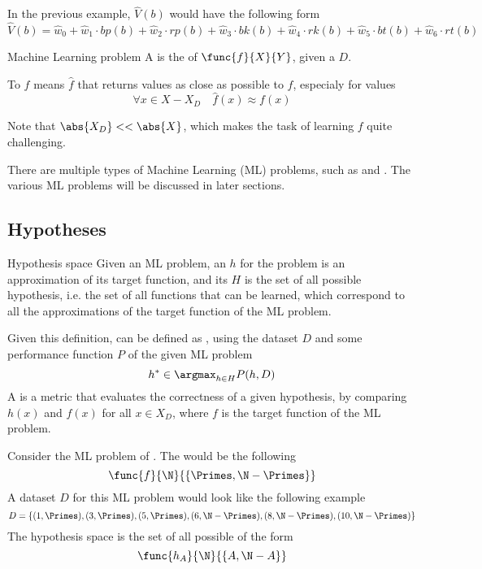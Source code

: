 \documentclass[a4paper, 12pt]{report}
\begin{document}
    In the previous example, $\hat V(b)$ would have the following form $$\hat V(b) = \hat w_0 + \hat w_1 \cdot bp(b) + \hat w_2 \cdot rp(b) + \hat w_3 \cdot bk(b) + \hat w_4 \cdot rk(b) + \hat w_5 \cdot bt(b) + \hat w_6 \cdot rt(b)$$

    \begin{frameddefn}{Machine Learning problem}
        A  is the  of  $\func{f}{X}{Y}$, given a  $D$.

        To  $f$ means  $\hat f$ that returns values as close as possible to $f$, especialy for values  $$\forall x \in  X - X_D \quad \hat f(x) \approx f(x)$$
    \end{frameddefn}

    Note that $\abs{X_D} << \abs{X}$, which makes the task of learning $f$ quite challenging.

    There are multiple types of Machine Learning (ML) problems, such as  and . The various ML problems will be discussed in later sections.

    \subsection{Hypotheses}
    
    \begin{frameddefn}{Hypothesis space}
        Given an ML problem, an  $h$ for the problem is an approximation of its target function, and its  $H$ is the set of all possible hypothesis, i.e. the set of all functions that can be learned, which correspond to all the approximations of the target function of the ML problem.
    \end{frameddefn}

    Given this definition,  can be defined as , using the dataset $D$ and some performance function $P$ of the given ML problem $$h^* \in \argmax_{h \in H}{P(h, D)}$$ A  is a metric that evaluates the correctness of a given hypothesis, by comparing $h(x)$ and $f(x)$ for all $x \in X_D$, where $f$ is the target function of the ML problem.

    \begin{example}[Hypothesis]
        Consider the ML problem of . The  would be the following $$\func{f}{\N}{\{\Primes, \N - \Primes\}}$$ A dataset $D$ for this ML problem would look like the following example $$D = \{(1, \Primes), (3, \Primes), (5, \Primes), (6, \N - \Primes), (8, \N - \Primes), (10, \N - \Primes)\}$$ The hypothesis space is the set of all possible  of the form $$\func{h_A}{\N}{\{A, \N - A\}}$$
    \end{example}
\end{document}
